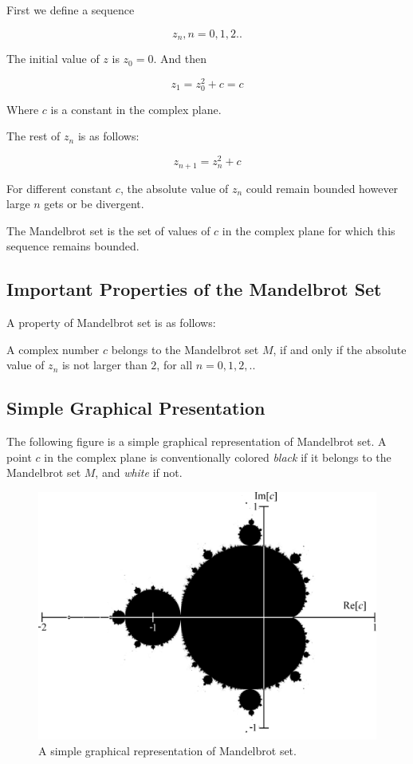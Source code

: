 First we define a sequence

\[z_n, n = 0, 1, 2 ..\]

The initial value of $z$ is $z_0 = 0$. And then

\[z_1 = z_0^2 + c = c\]

Where $c$ is a constant in the complex plane.

The rest of $z_n$ is as follows:

\[z_{n+1} = z_n^2 + c\]

For different constant $c$, the absolute value of $z_n$ could remain bounded however large $n$ gets or be divergent.

The Mandelbrot set is the set of values of $c$ in the complex plane for which this sequence remains bounded.

\subsection{Important Properties of the Mandelbrot Set}

A property of Mandelbrot set is as follows:

A complex number $c$ belongs to the Mandelbrot set $M$, if and only if the absolute value of $z_n$ is not larger than $2$, for all $n = 0, 1, 2, ..$

\subsection{Simple Graphical Presentation}

The following figure  is a simple graphical representation of Mandelbrot set. A point $c$ in the complex plane is conventionally colored \emph{black} if it belongs to the Mandelbrot set $M$, and \emph{white} if not. 

\begin{figure}[th]
\centering
\includegraphics[width=\textwidth,keepaspectratio]{Figures/Chapter2/mandelbrot.png}
\decoRule
\caption[Mandelbrot Set Graphical Presentation]{A simple graphical representation of Mandelbrot set.}
\label{fig:mandelbrot}
\end{figure}

